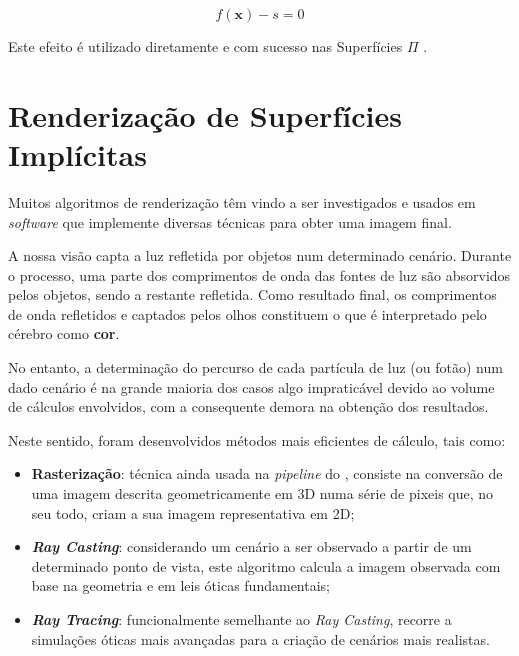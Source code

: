 \begin{equation}
	f(\mathbf{x}) - s = 0
	\label{eq::suavizacao}
\end{equation}

Este efeito é utilizado diretamente e com sucesso nas Superfícies $\Pi$ \cite{Raposo2019}.


\section{Renderização de Superfícies Implícitas}
\label{sec::arte:render}

Muitos algoritmos de renderização têm vindo a ser investigados e usados em \textit{software} que implemente diversas técnicas para obter uma imagem final.

A nossa visão capta a luz refletida por objetos num determinado cenário. Durante o processo, uma parte dos comprimentos de onda das fontes de luz são absorvidos pelos objetos, sendo a restante refletida. Como resultado final, os comprimentos de onda refletidos e captados pelos olhos constituem o que é interpretado pelo cérebro como \textbf{cor}.

No entanto, a determinação do percurso de cada partícula de luz (ou fotão) num dado cenário é na grande maioria dos casos algo impraticável devido ao volume de cálculos envolvidos, com a consequente demora na obtenção dos resultados.

Neste sentido, foram desenvolvidos métodos mais eficientes de cálculo, tais como:

\begin{itemize}
    \item \textbf{Rasterização}: técnica ainda usada na \textit{pipeline} do \opengl, consiste na conversão de uma imagem descrita geometricamente em 3D numa série de pixeis que, no seu todo, criam a sua imagem representativa em 2D;
    
    \item \textbf{\itshape Ray Casting}: considerando um cenário a ser observado a partir de um determinado ponto de vista, este algoritmo calcula a imagem observada com base na geometria e em leis óticas fundamentais;
    
    \item \textbf{\itshape Ray Tracing}: funcionalmente semelhante ao \textit{Ray Casting}, recorre a simulações óticas mais avançadas para a criação de cenários mais realistas.
\end{itemize}


